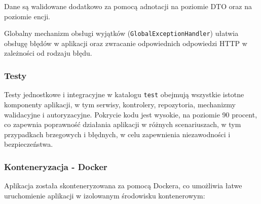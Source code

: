 \documentclass[../../main.tex]{subfiles}
\begin{document}
    Dane są walidowane dodatkowo za pomocą adnotacji na poziomie DTO oraz na poziomie encji.

    Globalny mechanizm obsługi wyjątków (\texttt{GlobalExceptionHandler}) ułatwia obsługę błędów w aplikacji oraz zwracanie odpowiednich odpowiedzi HTTP w zależności od rodzaju błędu.

    \subsubsection{Testy}
    Testy jednostkowe i integracyjne w katalogu \texttt{test} obejmują wszystkie istotne komponenty aplikacji, w tym serwisy, kontrolery, repozytoria, mechanizmy walidacyjne i autoryzacyjne.
    Pokrycie kodu jest wysokie, na poziomie 90 procent, co zapewnia poprawność działania aplikacji w różnych scenariuszach, w tym przypadkach brzegowych i błędnych, w celu zapewnienia niezawodności i bezpieczeństwa.

    \subsubsection{Konteneryzacja - Docker}
    Aplikacja została skonteneryzowana za pomocą Dockera, co umożliwia łatwe uruchomienie aplikacji w izolowanym środowisku kontenerowym:
\end{document}
